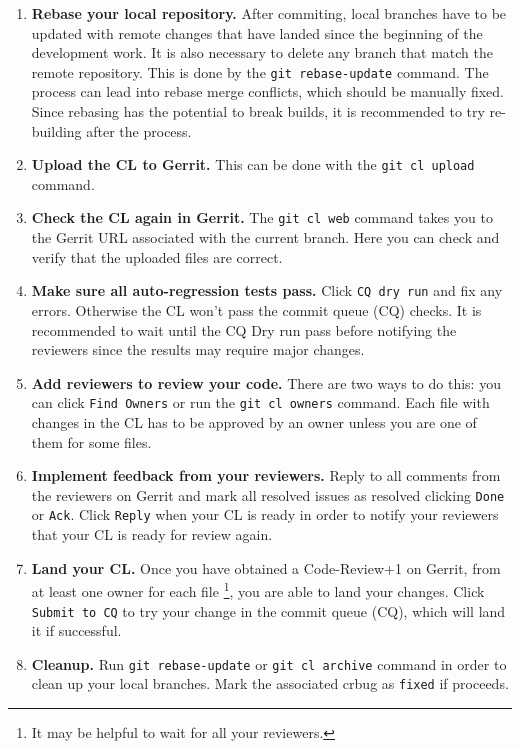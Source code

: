 \begin{enumerate}
    \item \textbf{Rebase your local repository.} After commiting, local branches have to be updated with remote changes that have landed since the beginning of the development work. It is also necessary to delete any branch that match the remote repository. This is done by the \texttt{git rebase-update} command. The process can lead into rebase merge conflicts, which should be manually fixed. Since rebasing has the potential to break builds, it is recommended to try re-building after the process.
    \item \textbf{Upload the CL to Gerrit.} This can be done with the \texttt{git cl upload} command.
    \item \textbf{Check the CL again in Gerrit.} The \texttt{git cl web} command takes you to the Gerrit URL associated with the current branch. Here you can check and verify that the uploaded files are correct.
    \item \textbf{Make sure all auto-regression tests pass.} Click \texttt{CQ dry run} and fix any errors. Otherwise the CL won't pass the commit queue (CQ) checks. It is recommended to wait until the CQ Dry run pass before notifying the reviewers since the results may require major changes.
    \item \textbf{Add reviewers to review your code.} There are two ways to do this: you can click \texttt{Find Owners} or run the \texttt{git cl owners} command. Each file with changes in the CL has to be approved by an owner unless you are one of them for some files.
    \item \textbf{Implement feedback from your reviewers.} Reply to all comments from the reviewers on Gerrit and mark all resolved issues as resolved clicking \texttt{Done} or \texttt{Ack}. Click \texttt{Reply} when your CL is ready in order to notify your reviewers that your CL is ready for review again.
    \item \textbf{Land your CL.} Once you have obtained a Code-Review+1 on Gerrit, from at least one owner for each file \footnote{It may be helpful to wait for all your reviewers.}, you are able to land your changes. Click \texttt{Submit to CQ} to try your change in the commit queue (CQ), which will land it if successful.
    \item \textbf{Cleanup.} Run \texttt{git rebase-update} or \texttt{git cl archive} command in order to clean up your local branches. Mark the associated crbug as \texttt{fixed} if proceeds.
\end{enumerate}

